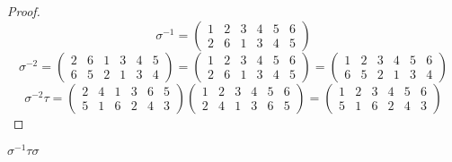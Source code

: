 \begin{proof}
    \[
        {\sigma}^{-1} =
        \begin{pmatrix}
            1 & 2 & 3 & 4 & 5 & 6 \\
            2 & 6 & 1 & 3 & 4 & 5
        \end{pmatrix}
    \]
    \[
        {\sigma}^{-2} =
        \begin{pmatrix}
            2 & 6 & 1 & 3 & 4 & 5 \\
            6 & 5 & 2 & 1 & 3 & 4
        \end{pmatrix} =
        \begin{pmatrix}
            1 & 2 & 3 & 4 & 5 & 6 \\
            2 & 6 & 1 & 3 & 4 & 5
        \end{pmatrix} =
        \begin{pmatrix}
            1 & 2 & 3 & 4 & 5 & 6 \\
            6 & 5 & 2 & 1 & 3 & 4
        \end{pmatrix}
    \]
    \[
        {\sigma}^{-2}\tau =
        \begin{pmatrix}
            2 & 4 & 1 & 3 & 6 & 5 \\
            5 & 1 & 6 & 2 & 4 & 3
        \end{pmatrix}
        \begin{pmatrix}
            1 & 2 & 3 & 4 & 5 & 6 \\
            2 & 4 & 1 & 3 & 6 & 5
        \end{pmatrix} =
        \begin{pmatrix}
            1 & 2 & 3 & 4 & 5 & 6 \\
            5 & 1 & 6 & 2 & 4 & 3
        \end{pmatrix}
    \]
\end{proof}

\begin{exercise}
    ${\sigma}^{-1}\tau\sigma$
\end{exercise}


